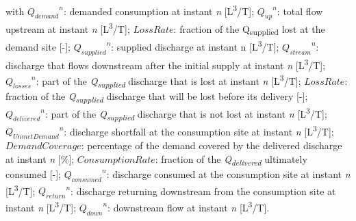 \documentclass[
  letterpaper,
  DIV=11,
  numbers=noendperiod]{scrreprt}
\begin{document}
with \({Q_{demand}}^n\): demanded consumption at instant \emph{n}
{[}L\textsuperscript{3}/T{]}; \({Q_{up}}^n\): total flow upstream at
instant \emph{n} {[}L\textsuperscript{3}/T{]}; \(LossRate\): fraction of
the Q\textsubscript{supplied} lost at the demand site {[}-{]};
\({Q_{supplied}}^n\): supplied discharge at instant n
{[}L\textsuperscript{3}/T{]}; \({Q_{stream}}^n\): discharge that flows
downstream after the initial supply at instant \emph{n}
{[}L\textsuperscript{3}/T{]}; \({Q_{losses}}^n\): part of the
\emph{Q\textsubscript{supplied}} discharge that is lost at instant
\emph{n} {[}L\textsuperscript{3}/T{]}; \(LossRate\): fraction of the
\emph{Q\textsubscript{supplied}} discharge that will be lost before its
delivery {[}-{]}; \({Q_{delivered}}^n\): part of the
\emph{Q\textsubscript{supplied}} discharge that is not lost at instant
\emph{n} {[}L\textsuperscript{3}/T{]}; \({Q_{UnmetDemand}}^n\):
discharge shortfall at the consumption site at instant \emph{n}
{[}L\textsuperscript{3}/T{]}; \(DemandCoverage\): percentage of the
demand covered by the delivered discharge at instant \emph{n} {[}\%{]};
\(ConsumptionRate\): fraction of the \emph{Q\textsubscript{delivered}}
ultimately consumed {[}-{]}; \({Q_{consumed}}^n\): discharge consumed at
the consumption site at instant \emph{n} {[}L\textsuperscript{3}/T{]};
\({Q_{return}}^n\): discharge returning downstream from the consumption
site at instant \emph{n} {[}L\textsuperscript{3}/T{]}; \({Q_{down}}^n\):
downstream flow at instant \emph{n} {[}L\textsuperscript{3}/T{]}.
\end{document}
